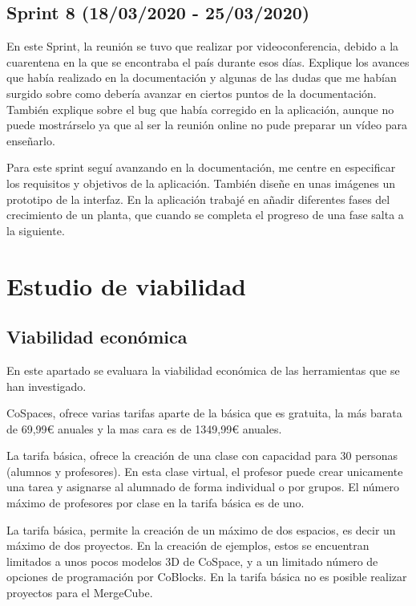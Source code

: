 \subsection{Sprint 8 (18/03/2020 - 25/03/2020)}
En este Sprint, la reunión se tuvo que realizar por videoconferencia, debido a la cuarentena en la que se encontraba el país durante esos días. Explique los avances que había realizado en la documentación y algunas de las dudas que me habían surgido sobre como debería avanzar en ciertos puntos de la documentación. También explique sobre el bug que había corregido en la aplicación, aunque no puede mostrárselo ya que al ser la reunión online  no pude preparar un vídeo para enseñarlo.
 
Para este sprint seguí avanzando en la documentación, me centre en especificar los requisitos y objetivos de la aplicación. También diseñe en unas imágenes un prototipo de la interfaz. En la aplicación trabajé en añadir diferentes fases del crecimiento de un planta, que cuando se completa el progreso de una fase salta a la siguiente. 


\section{Estudio de viabilidad}

\subsection{Viabilidad económica}

En este apartado se evaluara la viabilidad económica de las herramientas que se han investigado.


CoSpaces, ofrece varias tarifas aparte de la básica que es gratuita, la más barata de 69,99\euro{}  anuales y la mas cara es de 1349,99\euro{} anuales.

La tarifa básica, ofrece la creación de una clase con capacidad para 30 personas (alumnos y profesores). En esta clase virtual, el profesor puede crear unicamente una tarea y asignarse al alumnado de forma individual o por grupos. El número máximo de profesores por clase en la tarifa básica es de uno.

La tarifa básica, permite la creación de un máximo de dos espacios, es decir un máximo de dos proyectos. En la creación de ejemplos, estos se encuentran limitados a unos pocos modelos 3D de CoSpace, y a un limitado número de opciones de programación por CoBlocks. En la tarifa básica no es posible realizar proyectos para el MergeCube.

